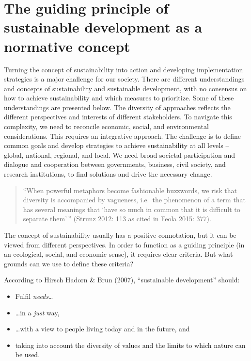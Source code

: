 \documentclass[
  a4paper,
  openany]{book}
\providecommand{\tightlist}{%
  \setlength{\itemsep}{0pt}\setlength{\parskip}{0pt}}
\begin{document}
\section{The guiding principle of sustainable development as a normative
concept}\label{the-guiding-principle-of-sustainable-development-as-a-normative-concept}

Turning the concept of sustainability into action and developing
implementation strategies is a major challenge for our society. There
are different understandings and concepts of sustainability and
sustainable development, with no consensus on how to achieve
sustainability and which measures to prioritize. Some of these
understandings are presented below. The diversity of approaches reflects
the different perspectives and interests of different stakeholders. To
navigate this complexity, we need to reconcile economic, social, and
environmental considerations. This requires an integrative approach. The
challenge is to define common goals and develop strategies to achieve
sustainability at all levels -- global, national, regional, and local.
We need broad societal participation and dialogue and cooperation
between governments, business, civil society, and research institutions,
to find solutions and drive the necessary change.

\begin{quote}
``When powerful metaphors become fashionable buzzwords, we risk that
diversity is accompanied by vagueness, i.e.~the phenomenon of a term
that has several meanings that `have so much in common that it is
difficult to separate them'\,'' (Strunz 2012: 113 as cited in Feola
2015: 377).
\end{quote}

The concept of sustainability usually has a positive connotation, but it
can be viewed from different perspectives. In order to function as a
guiding principle (in an ecological, social, and economic sense), it
requires clear criteria. But what grounds can we use to define these
criteria?

According to Hirsch Hadorn \& Brun (2007), ``sustainable development''
should:

\begin{itemize}
\tightlist
\item
  Fulfil \emph{needs}\ldots{}
\item
  \ldots in a \emph{just} way,
\item
  \ldots with a view to people living today and in the future, and
\item
  taking into account the diversity of values and the limits to which
  nature can be used.
\end{itemize}
\end{document}

